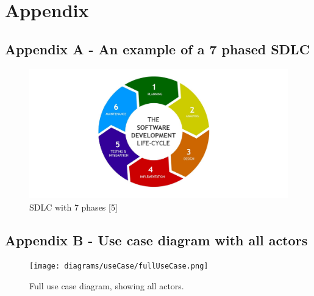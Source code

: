 \section{Appendix}

  \label{sec:AppendixA}
  \subsection{Appendix A - An example of a 7 phased SDLC}
    \begin{figure}[H]
      \centering
      \includegraphics[width=12cm]{assets/sdlc7.jpg}
      \caption{SDLC with 7 phases [5]}
      \label{fig:SDLC7}
    \end{figure}

  \begin{landscape}
    \label{sec:AppendixB}
    \subsection{Appendix B - Use case diagram with all actors}
      \begin{figure}[H]
        \centering
        \texttt{[image: diagrams/useCase/fullUseCase.png]}
        \caption{Full use case diagram, showing all actors.}
        \label{fig:UCfull}
      \end{figure}
  \end{landscape}
